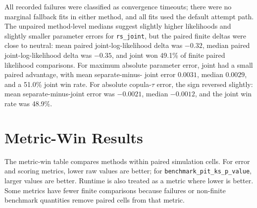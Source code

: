 \documentclass[11pt]{article}
\begin{document}
All recorded failures were classified as convergence timeouts; there were no
marginal fallback fits in either method, and all fits used the default attempt
path.  The unpaired method-level medians suggest slightly higher likelihoods
and slightly smaller parameter errors for \texttt{rs\_joint}, but the paired
finite deltas were close to neutral: mean paired joint-log-likelihood delta was
\(-0.32\), median paired joint-log-likelihood delta was \(-0.35\), and joint
won 49.1\% of finite paired likelihood comparisons.  For maximum absolute
parameter error, joint had a small paired advantage, with mean separate-minus-
joint error \(0.0031\), median \(0.0029\), and a 51.0\% joint win rate.  For
absolute copula-\(\tau\) error, the sign reversed slightly: mean
separate-minus-joint error was \(-0.0021\), median \(-0.0012\), and the joint
win rate was 48.9\%.

\section{Metric-Win Results}

The metric-win table compares methods within paired simulation cells.  For
error and scoring metrics, lower raw values are better; for
\texttt{benchmark\_pit\_ks\_p\_value}, larger values are better.  Runtime is
also treated as a metric where lower is better.  Some metrics have fewer finite
comparisons because failures or non-finite benchmark quantities remove paired
cells from that metric.
\end{document}
